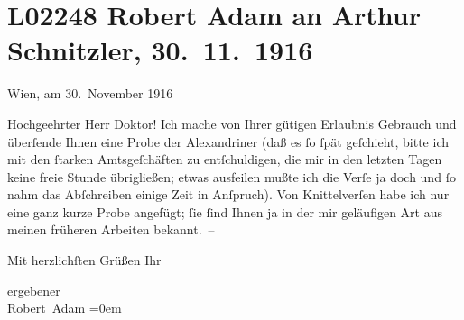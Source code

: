 

\section[Robert Adam an Arthur Schnitzler, 30. 11. 1916]{L02248 Robert Adam an Arthur Schnitzler, 30. 11. 1916}
\nopagebreak{}
\rehead{ }\normalsize\beginnumbering{}
\toendnotes[C]{\smallbreak\pagebreak[2]}
\toendnotes[C]{\smallbreak}
\pstart
           \raggedleft{}{\pb}Wien, am 30. November 1916\pend
           
\pstart{}Hochgeehrter Herr Doktor!\pend\vspace{0.5em}
\pstart
           Ich mache von Ihrer gütigen Erlaubnis Gebrauch und überſende Ihnen eine Probe der
               Alexandriner (daß es{ }ſo{ }ſpät geſchieht, bitte ich mit den{ }ſtarken Amtsgeſchäften zu
               entſchuldigen, die mir in den letzten Tagen keine freie Stunde übrigließen; etwas
               ausfeilen mußte ich die Verſe ja doch und{ }ſo nahm das Abſchreiben einige Zeit in
               Anſpruch). Von Knittelverſen habe ich nur eine ganz kurze Probe angefügt;{ }ſie{ }ſind
               Ihnen ja in der mir geläufi{\pb}gen Art aus meinen
               früheren Arbeiten bekannt. –\pend
           
\pstart
           Mit herzlichſten Grüßen Ihr\pend
           
\pstart
           ergebener{\\[\baselineskip]}\spacefill\mbox{Robert Adam}\pend
           \leftskip=0em{}\endnumbering{}  \newcommand{\dateiname}{L02248}\newcommand{\titel}{Robert Adam an Arthur Schnitzler, 30. 11. 1916}\newcommand{\editorInnen}{Martin Anton Müller und Gerd-Hermann Susen}
